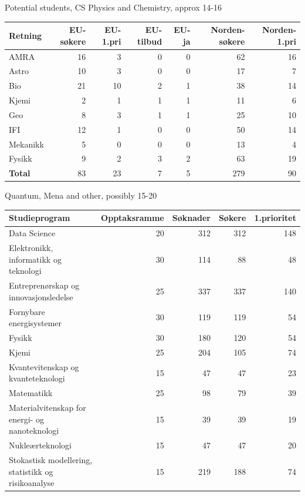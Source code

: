 \documentclass[10pt,aspectratio=169]{beamer}
\begin{document}
\begin{frame}{Potential students, CS Physics and Chemistry, approx 14-16}
\begin{table}[htbp]
\centering
\begin{tabular}{lrrrrrr}
\hline
\textbf{Retning} & \textbf{EU-søkere} & \textbf{EU-1.pri} & \textbf{EU-tilbud} & \textbf{EU-ja} & \textbf{Norden-søkere} & \textbf{Norden-1.pri} \\
\hline
AMRA     & 16 & 3  & 0 & 0 & 62 & 16 \\
Astro    & 10 & 3  & 0 & 0 & 17 & 7  \\
Bio      & 21 & 10 & 2 & 1 & 38 & 14 \\
Kjemi    & 2  & 1  & 1 & 1 & 11 & 6  \\
Geo      & 8  & 3  & 1 & 1 & 25 & 10 \\
IFI      & 12 & 1  & 0 & 0 & 50 & 14 \\
Mekanikk & 5  & 0  & 0 & 0 & 13 & 4  \\
Fysikk   & 9  & 2  & 3 & 2 & 63 & 19 \\
\hline
\textbf{Total} & 83 & 23 & 7 & 5 & 279 & 90 \\
\hline
\end{tabular}
\end{table}
\end{frame}

\begin{frame}{Quantum, Mena and other, possibly 15-20}
\begin{table}[htbp]
\centering
\small
\begin{tabular}{lrrrr}
\hline
\textbf{Studieprogram} &
\textbf{Opptaksramme} &
\textbf{Søknader} &
\textbf{Søkere} &
\textbf{1.prioritet} \\
\hline
Data Science                                     & 20  & 312  & 312 & 148 \\
Elektronikk, informatikk og teknologi            & 30  & 114  & 88  & 48  \\
Entreprenørskap og innovasjonsledelse            & 25  & 337  & 337 & 140 \\
Fornybare energisystemer                         & 30  & 119  & 119 & 54  \\
Fysikk                                           & 30  & 180  & 120 & 54  \\
Kjemi                                            & 25  & 204  & 105 & 74  \\
Kvantevitenskap og kvanteteknologi               & 15  & 47   & 47  & 23  \\
Matematikk                                       & 25  & 98   & 79  & 39  \\
Materialvitenskap for energi- og nanoteknologi   & 15  & 39   & 39  & 19  \\
Nukleærteknologi                                 & 15  & 47   & 47  & 20  \\
Stokastisk modellering, statistikk og risikoanalyse & 15 & 219 & 188 & 74 \\
\hline
\end{tabular}
\end{table}
\end{frame}
\end{document}
